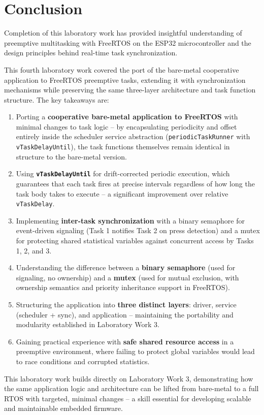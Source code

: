\section{Conclusion}

Completion of this laboratory work has provided insightful understanding of
preemptive multitasking with FreeRTOS on the ESP32 microcontroller and the design
principles behind real-time task synchronization.

This fourth laboratory work covered the port of the bare-metal cooperative application to
FreeRTOS preemptive tasks, extending it with synchronization mechanisms while preserving
the same three-layer architecture and task function structure. The key takeaways are:

\begin{enumerate}
  \item Porting a \textbf{cooperative bare-metal application to FreeRTOS} with minimal
    changes to task logic -- by encapsulating periodicity and offset entirely inside the
    scheduler service abstraction (\texttt{periodicTaskRunner} with \texttt{vTaskDelayUntil}),
    the task functions themselves remain identical in structure to the bare-metal version.
  \item Using \textbf{\texttt{vTaskDelayUntil}} for drift-corrected periodic execution,
    which guarantees that each task fires at precise intervals regardless of how long the
    task body takes to execute -- a significant improvement over relative \texttt{vTaskDelay}.
  \item Implementing \textbf{inter-task synchronization} with a binary semaphore for
    event-driven signaling (Task 1 notifies Task 2 on press detection) and a mutex for
    protecting shared statistical variables against concurrent access by Tasks 1, 2, and 3.
  \item Understanding the difference between a \textbf{binary semaphore} (used for
    signaling, no ownership) and a \textbf{mutex} (used for mutual exclusion, with
    ownership semantics and priority inheritance support in FreeRTOS).
  \item Structuring the application into \textbf{three distinct layers}: driver, service
    (scheduler + sync), and application -- maintaining the portability and modularity
    established in Laboratory Work 3.
  \item Gaining practical experience with \textbf{safe shared resource access} in a
    preemptive environment, where failing to protect global variables would lead to
    race conditions and corrupted statistics.
\end{enumerate}

This laboratory work builds directly on Laboratory Work 3, demonstrating how the same
application logic and architecture can be lifted from bare-metal to a full RTOS with
targeted, minimal changes -- a skill essential for developing scalable and maintainable
embedded firmware.

